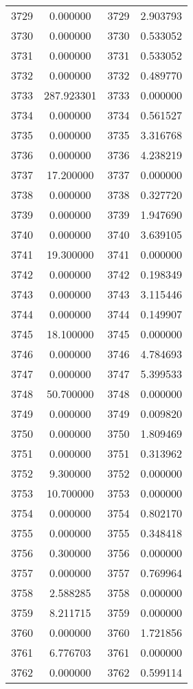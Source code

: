 \documentclass[12pt]{article}
\begin{document}
\begin{longtable}{@{}cccc@{}}
3729 & 0.000000 & 3729 & 2.903793 \\
3730 & 0.000000 & 3730 & 0.533052 \\
3731 & 0.000000 & 3731 & 0.533052 \\
3732 & 0.000000 & 3732 & 0.489770 \\
3733 & 287.923301 & 3733 & 0.000000 \\
3734 & 0.000000 & 3734 & 0.561527 \\
3735 & 0.000000 & 3735 & 3.316768 \\
3736 & 0.000000 & 3736 & 4.238219 \\
3737 & 17.200000 & 3737 & 0.000000 \\
3738 & 0.000000 & 3738 & 0.327720 \\
3739 & 0.000000 & 3739 & 1.947690 \\
3740 & 0.000000 & 3740 & 3.639105 \\
3741 & 19.300000 & 3741 & 0.000000 \\
3742 & 0.000000 & 3742 & 0.198349 \\
3743 & 0.000000 & 3743 & 3.115446 \\
3744 & 0.000000 & 3744 & 0.149907 \\
3745 & 18.100000 & 3745 & 0.000000 \\
3746 & 0.000000 & 3746 & 4.784693 \\
3747 & 0.000000 & 3747 & 5.399533 \\
3748 & 50.700000 & 3748 & 0.000000 \\
3749 & 0.000000 & 3749 & 0.009820 \\
3750 & 0.000000 & 3750 & 1.809469 \\
3751 & 0.000000 & 3751 & 0.313962 \\
3752 & 9.300000 & 3752 & 0.000000 \\
3753 & 10.700000 & 3753 & 0.000000 \\
3754 & 0.000000 & 3754 & 0.802170 \\
3755 & 0.000000 & 3755 & 0.348418 \\
3756 & 0.300000 & 3756 & 0.000000 \\
3757 & 0.000000 & 3757 & 0.769964 \\
3758 & 2.588285 & 3758 & 0.000000 \\
3759 & 8.211715 & 3759 & 0.000000 \\
3760 & 0.000000 & 3760 & 1.721856 \\
3761 & 6.776703 & 3761 & 0.000000 \\
3762 & 0.000000 & 3762 & 0.599114 \\

\end{longtable}
\end{document}
